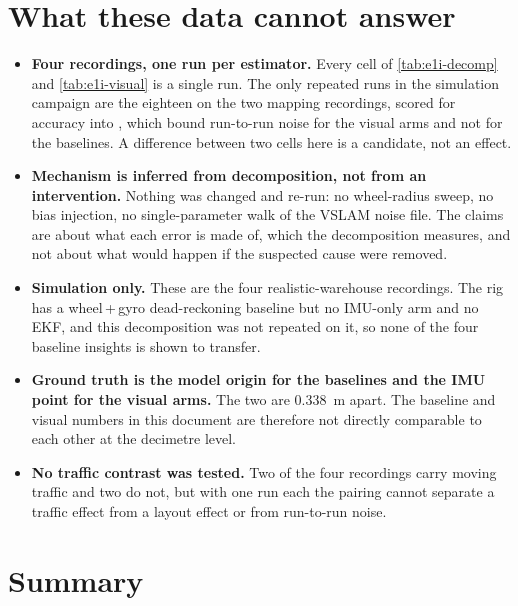 \documentclass[11pt,a4paper,notitlepage]{report}
\begin{document}
\FloatBarrier
\section{What these data cannot answer}

\begin{itemize}
\item \textbf{Four recordings, one run per estimator.} Every cell of
      \cref{tab:e1i-decomp} and \cref{tab:e1i-visual} is a single run. The
      only repeated runs in the simulation campaign are the eighteen on the
      two mapping recordings, scored for accuracy into
      , which bound
      run-to-run noise for the visual arms and not for the baselines. A
      difference between two cells here is a candidate, not an effect.
\item \textbf{Mechanism is inferred from decomposition, not from an
      intervention.} Nothing was changed and re-run: no wheel-radius sweep, no
      bias injection, no single-parameter walk of the VSLAM noise file. The
      claims are about what each error is made of, which the decomposition
      measures, and not about what would happen if the suspected cause were
      removed.
\item \textbf{Simulation only.} These are the four realistic-warehouse
      recordings. The rig has a wheel\,+\,gyro dead-reckoning
      baseline but no IMU-only arm and no EKF, and this decomposition was not
      repeated on it, so none of the four baseline insights is shown to
      transfer.
\item \textbf{Ground truth is the model origin for the baselines and the IMU
      point for the visual arms.} The two are \SI{0.338}{\metre} apart. The
      baseline and visual numbers in this document are therefore not directly
      comparable to each other at the decimetre level.
\item \textbf{No traffic contrast was tested.} Two of the four recordings
      carry moving traffic and two do not, but with one run each the pairing
      cannot separate a traffic effect from a layout effect or from run-to-run
      noise.
\end{itemize}

\section{Summary}
\end{document}
